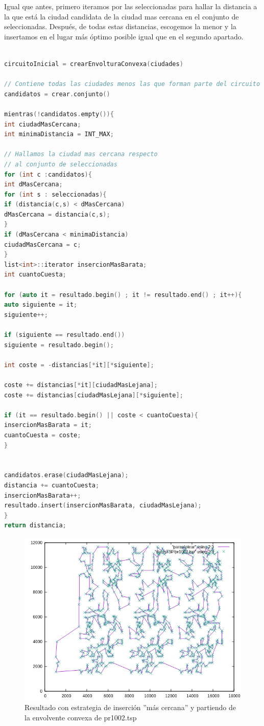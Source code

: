 \documentclass{article}
\begin{document}
Igual que antes, primero iteramos por las seleccionadas para hallar la distancia a la que está la ciudad candidata de la ciudad mas cercana en el conjunto de seleccionadas.
Después, de todas estas distancias, escogemos la menor y la insertamos en el lugar más óptimo posible igual que en el segundo apartado.
\begin{lstlisting}[language=c, caption =Pseudocódigo de inserción con envoltura convexa y ciudad más lejana]

circuitoInicial = crearEnvolturaConvexa(ciudades)

// Contiene todas las ciudades menos las que forman parte del circuito inicial
candidatos = crear.conjunto()

mientras(!candidatos.empty()){
int ciudadMasCercana;
int minimaDistancia = INT_MAX;

// Hallamos la ciudad mas cercana respecto
// al conjunto de seleccionadas
for (int c :candidatos){
int dMasCercana;
for (int s : seleccionadas){
if (distancia(c,s) < dMasCercana)
dMasCercana = distancia(c,s);
}
if (dMasCercana < minimaDistancia)
ciudadMasCercana = c;
}
list<int>::iterator insercionMasBarata;
int cuantoCuesta;

for (auto it = resultado.begin() ; it != resultado.end() ; it++){
auto siguiente = it;
siguiente++;

if (siguiente == resultado.end())
siguiente = resultado.begin();

int coste = -distancias[*it][*siguiente];

coste += distancias[*it][ciudadMasLejana];
coste += distancias[ciudadMasLejana][*siguiente];

if (it == resultado.begin() || coste < cuantoCuesta){
insercionMasBarata = it;
cuantoCuesta = coste;
}


candidatos.erase(ciudadMasLejana);
distancia += cuantoCuesta;
insercionMasBarata++;
resultado.insert(insercionMasBarata, ciudadMasLejana);	
}
return distancia;

\end{lstlisting}

\begin{figure}[H]
	\centering
	\includegraphics[totalheight=8cm]{img/convex_second}
	\caption{Resultado con estrategia de inserción ''más cercana'' y partiendo de la envolvente convexa de pr1002.tsp}
	\label{fig:convex_second}
	\end{figure}	
\end{document}
